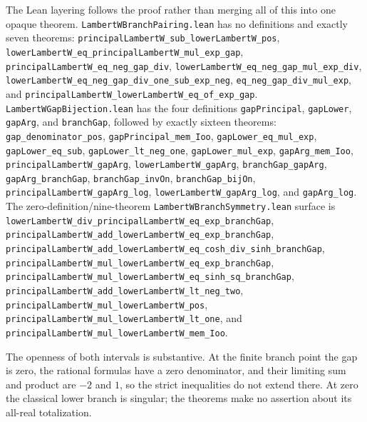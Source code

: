 \documentclass[11pt,oneside]{article}
\theoremstyle{definition}
\theoremstyle{remark}
\begin{document}
The Lean layering follows the proof rather than merging all of this into one
opaque theorem.  \nolinkurl{LambertWBranchPairing.lean} has no definitions
and exactly seven theorems:
\nolinkurl{principalLambertW_sub_lowerLambertW_pos},
\nolinkurl{lowerLambertW_eq_principalLambertW_mul_exp_gap},
\nolinkurl{principalLambertW_eq_neg_gap_div},
\nolinkurl{lowerLambertW_eq_neg_gap_mul_exp_div},
\nolinkurl{lowerLambertW_eq_neg_gap_div_one_sub_exp_neg},
\nolinkurl{eq_neg_gap_div_mul_exp}, and
\nolinkurl{principalLambertW_lowerLambertW_eq_of_exp_gap}.
\nolinkurl{LambertWGapBijection.lean} has the four definitions
\nolinkurl{gapPrincipal}, \nolinkurl{gapLower}, \nolinkurl{gapArg}, and
\nolinkurl{branchGap}, followed by exactly sixteen theorems:
\nolinkurl{gap_denominator_pos}, \nolinkurl{gapPrincipal_mem_Ioo},
\nolinkurl{gapLower_eq_mul_exp}, \nolinkurl{gapLower_eq_sub},
\nolinkurl{gapLower_lt_neg_one}, \nolinkurl{gapLower_mul_exp},
\nolinkurl{gapArg_mem_Ioo}, \nolinkurl{principalLambertW_gapArg},
\nolinkurl{lowerLambertW_gapArg}, \nolinkurl{branchGap_gapArg},
\nolinkurl{gapArg_branchGap}, \nolinkurl{branchGap_invOn},
\nolinkurl{branchGap_bijOn}, \nolinkurl{principalLambertW_gapArg_log},
\nolinkurl{lowerLambertW_gapArg_log}, and \nolinkurl{gapArg_log}.
The zero-definition/nine-theorem
\nolinkurl{LambertWBranchSymmetry.lean} surface is
\nolinkurl{lowerLambertW_div_principalLambertW_eq_exp_branchGap},
\nolinkurl{principalLambertW_add_lowerLambertW_eq_exp_branchGap},
\nolinkurl{principalLambertW_add_lowerLambertW_eq_cosh_div_sinh_branchGap},
\nolinkurl{principalLambertW_mul_lowerLambertW_eq_exp_branchGap},
\nolinkurl{principalLambertW_mul_lowerLambertW_eq_sinh_sq_branchGap},
\nolinkurl{principalLambertW_add_lowerLambertW_lt_neg_two},
\nolinkurl{principalLambertW_mul_lowerLambertW_pos},
\nolinkurl{principalLambertW_mul_lowerLambertW_lt_one}, and
\nolinkurl{principalLambertW_mul_lowerLambertW_mem_Ioo}.

The openness of both intervals is substantive.  At the finite branch point
the gap is zero, the rational formulas have a zero denominator, and their
limiting sum and product are \(-2\) and \(1\), so the strict inequalities do
not extend there.  At zero the classical lower branch is singular; the
theorems make no assertion about its all-real totalization.
\end{document}

